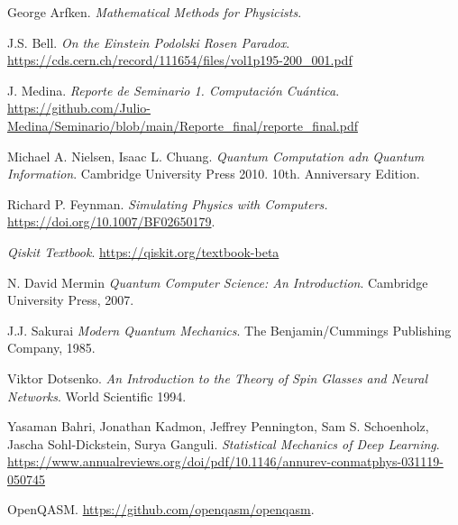 \documentclass[a4paper]{article}
\begin{document}
\begin{thebibliography}{99}
 George Arfken. \textit{Mathematical Methods for Physicists}.

 J.S. Bell. \textit{On the Einstein Podolski Rosen Paradox}. \url{https://cds.cern.ch/record/111654/files/vol1p195-200_001.pdf}

 J. Medina. \textit{Reporte de Seminario 1. Computación Cuántica}. \url{https://github.com/Julio-Medina/Seminario/blob/main/Reporte_final/reporte_final.pdf}

 Michael A. Nielsen, Isaac L. Chuang. \textit{Quantum Computation adn Quantum Information}. Cambridge University Press 2010. 10th. Anniversary Edition.

 Richard P. Feynman. \textit{Simulating Physics with Computers.} \url{https://doi.org/10.1007/BF02650179}.

 \textit{Qiskit Textbook}. \url{https://qiskit.org/textbook-beta}

 N. David Mermin \textit{Quantum Computer Science: An Introduction}. Cambridge University Press, 2007.

 J.J. Sakurai \textit{Modern Quantum Mechanics}. The Benjamin/Cummings Publishing Company, 1985.

 Viktor Dotsenko. \textit{An Introduction to the Theory of Spin Glasses and Neural Networks}. World Scientific 1994.

 Yasaman Bahri, Jonathan Kadmon, Jeffrey Pennington, Sam S. Schoenholz, Jascha Sohl-Dickstein, Surya Ganguli. \textit{Statistical Mechanics of Deep Learning}. \url{https://www.annualreviews.org/doi/pdf/10.1146/annurev-conmatphys-031119-050745}

 OpenQASM. \url{https://github.com/openqasm/openqasm}.
 

\end{thebibliography}
\end{document}
